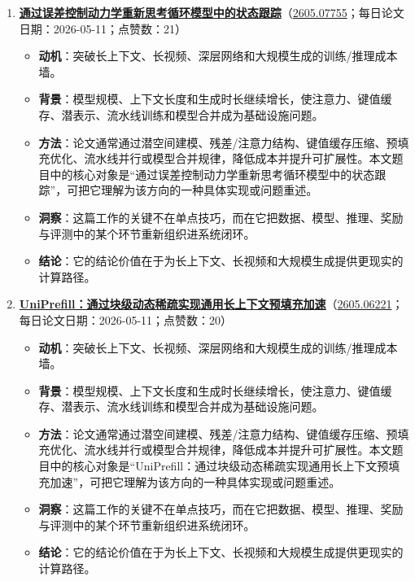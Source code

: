 \begin{enumerate}[leftmargin=1.5em]
\begin{itemize}[leftmargin=1.5em]
    \item \textbf{结论}：它的结论价值在于为长上下文、长视频和大规模生成提供更现实的计算路径。
  \end{itemize}
  \item \textbf{\href{https://huggingface.co/papers/2605.07755}{通过误差控制动力学重新思考循环模型中的状态跟踪}}（\href{https://arxiv.org/abs/2605.07755}{2605.07755}；每日论文日期：2026-05-11；点赞数：21）
  \begin{itemize}[leftmargin=1.5em]
    \item \textbf{动机}：突破长上下文、长视频、深层网络和大规模生成的训练/推理成本墙。
    \item \textbf{背景}：模型规模、上下文长度和生成时长继续增长，使注意力、键值缓存、潜表示、流水线训练和模型合并成为基础设施问题。
    \item \textbf{方法}：论文通常通过潜空间建模、残差/注意力结构、键值缓存压缩、预填充优化、流水线并行或模型合并规律，降低成本并提升可扩展性。本文题目中的核心对象是“通过误差控制动力学重新思考循环模型中的状态跟踪”，可把它理解为该方向的一种具体实现或问题重述。
    \item \textbf{洞察}：这篇工作的关键不在单点技巧，而在它把数据、模型、推理、奖励与评测中的某个环节重新组织进系统闭环。
    \item \textbf{结论}：它的结论价值在于为长上下文、长视频和大规模生成提供更现实的计算路径。
  \end{itemize}
  \item \textbf{\href{https://huggingface.co/papers/2605.06221}{UniPrefill：通过块级动态稀疏实现通用长上下文预填充加速}}（\href{https://arxiv.org/abs/2605.06221}{2605.06221}；每日论文日期：2026-05-11；点赞数：20）
  \begin{itemize}[leftmargin=1.5em]
    \item \textbf{动机}：突破长上下文、长视频、深层网络和大规模生成的训练/推理成本墙。
    \item \textbf{背景}：模型规模、上下文长度和生成时长继续增长，使注意力、键值缓存、潜表示、流水线训练和模型合并成为基础设施问题。
    \item \textbf{方法}：论文通常通过潜空间建模、残差/注意力结构、键值缓存压缩、预填充优化、流水线并行或模型合并规律，降低成本并提升可扩展性。本文题目中的核心对象是“UniPrefill：通过块级动态稀疏实现通用长上下文预填充加速”，可把它理解为该方向的一种具体实现或问题重述。
    \item \textbf{洞察}：这篇工作的关键不在单点技巧，而在它把数据、模型、推理、奖励与评测中的某个环节重新组织进系统闭环。
    \item \textbf{结论}：它的结论价值在于为长上下文、长视频和大规模生成提供更现实的计算路径。

\end{itemize}
\end{enumerate}
